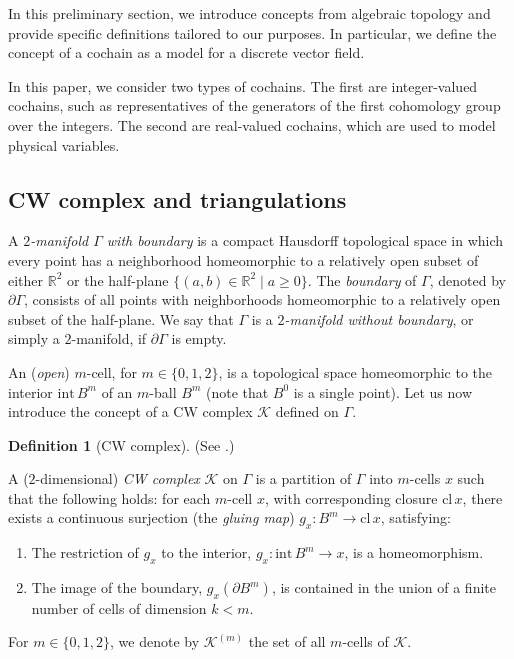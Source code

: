 \documentclass[a4paper,twoside,10pt]{article}
\theoremstyle{plain}
\theoremstyle{definition}
\newtheorem{definition}{Definition}[section]
\theoremstyle{remark}
\newcommand{\mc}{\mathcal}
\newcommand{\R}{\mathbb{R}}
\begin{document}
In this preliminary section, we introduce concepts from algebraic topology and provide specific definitions tailored to our purposes.
In particular, we define the concept of a cochain as a model for a discrete vector field.

In this paper, we consider two types of cochains. The first are integer-valued cochains, such as representatives of the generators of the first cohomology group over the integers.
The second are real-valued cochains, which are used to model physical variables.
\subsection{CW complex and triangulations}

A \emph{$2$-manifold $\Gamma$ with boundary} is a compact Hausdorff topological space in which every point has a neighborhood homeomorphic to a relatively open subset of either $\R^2$ or the half-plane $\{(a, b) \in \R^2 \mid a \geq 0\}$.
The \emph{boundary} of $\Gamma$, denoted by $\partial \Gamma$, consists of all points with neighborhoods homeomorphic to a relatively open subset of the half-plane.
We say that $\Gamma$ is a \emph{$2$-manifold without boundary}, or simply a $2$-manifold, if $\partial \Gamma$ is empty.

An (\emph{open}) $m$-cell, for $ m \in \{0, 1, 2\} $, is a topological space homeomorphic to the interior $\mathrm{int}\,B^m$ of an $m$-ball $B^m$ (note that $ B^0 $ is a single point).
Let us now introduce the concept of a CW complex $\mc{K}$ defined on $\Gamma$.
\begin{definition}[CW complex]
\label{def:CW_complex}
(See \cite[Section~4]{whitehead1949combinatorial}.)\par
A ($2$-dimensional) \emph{CW complex} $\mc{K}$ on $\Gamma$ is a partition of $\Gamma$ into $m$-cells $x$ such that the following holds:  
for each $m$-cell $x$, with corresponding closure $\mathrm{cl}\,x$, there exists a continuous surjection (the \emph{gluing map}) $ g_x : B^m \to \mathrm{cl}\,x $, satisfying:  
\begin{enumerate}[label=(\roman*)]
    \item The restriction of $ g_x $ to the interior, $ g_x: \mathrm{int}\,B^m \to x $, is a homeomorphism.
\item The image of the boundary, $ g_x(\partial B^m) $, is contained in the union of a finite number of cells of dimension $k < m$.
\end{enumerate}
\end{definition}
For $ m \in \{0, 1, 2\} $, we denote by $\mc{K}^{(m)}$ the set of all $m$-cells of $\mc{K}$.
\end{document}

